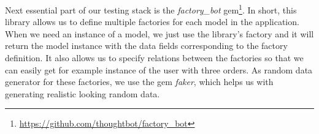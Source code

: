 Next essential part of our testing stack is  the \textit{factory\_bot} gem\footnote{\url{https://github.com/thoughtbot/factory_bot}}. In short, this library allows us to define multiple factories for each model in the application. When we need an instance of a model, we just use the library's factory and it will return the model instance with the data fields corresponding to the factory definition. It also allows us to specify relations between the factories so that we can easily get for example instance of the user with three orders. As random data generator for these factories, we use the gem \textit{faker}, which helps us with generating realistic looking random data.
